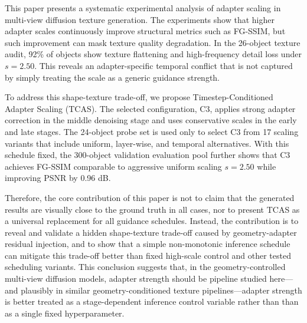 \documentclass[times,twocolumn,final]{elsarticle}
\providecommand{\DIFadd}[1]{{\protect\color{blue} \sf #1}} %
\providecommand{\DIFdel}[1]{{\protect\color{red} \scriptsize #1}} %
\providecommand{\DIFaddbegin}{} %
\providecommand{\DIFaddend}{} %
\providecommand{\DIFdelbegin}{} %
\providecommand{\DIFdelend}{} %
\newcommand{\DIFscaledelfig}{0.5}
\newlength{\DIFdelgraphicswidth} %
\newlength{\DIFdelgraphicsheight} %
\newcommand{\DIFaddincludegraphics}[2][]{{\color{blue}\fbox{\DIFOincludegraphics[#1]{#2}}}} %
\newcommand{\DIFdelincludegraphics}[2][]{%
\sbox{\DIFdelgraphicsbox}{\DIFOincludegraphics[#1]{#2}}%
\settoboxwidth{\DIFdelgraphicswidth}{\DIFdelgraphicsbox} %
\settoboxtotalheight{\DIFdelgraphicsheight}{\DIFdelgraphicsbox} %
\scalebox{\DIFscaledelfig}{%
\parbox[b]{\DIFdelgraphicswidth}{\usebox{\DIFdelgraphicsbox}\\[-\baselineskip] \rule{\DIFdelgraphicswidth}{0em}}\llap{\resizebox{\DIFdelgraphicswidth}{\DIFdelgraphicsheight}{%
\setlength{\unitlength}{\DIFdelgraphicswidth}%
\begin{picture}(1,1)%
\thicklines\linethickness{2pt} %
{\color[rgb]{1,0,0}\put(0,0){\framebox(1,1){}}}%
{\color[rgb]{1,0,0}\put(0,0){\line( 1,1){1}}}%
{\color[rgb]{1,0,0}\put(0,1){\line(1,-1){1}}}%
\end{picture}%
}\hspace*{3pt}}} %
} %
\DeclareRobustCommand{\DIFaddbegin}{\DIFOaddbegin \let\includegraphics\DIFaddincludegraphics} %
\DeclareRobustCommand{\DIFaddend}{\DIFOaddend \let\includegraphics\DIFOincludegraphics} %
\DeclareRobustCommand{\DIFdelbegin}{\DIFOdelbegin \let\includegraphics\DIFdelincludegraphics} %
\DeclareRobustCommand{\DIFdelend}{\DIFOaddend \let\includegraphics\DIFOincludegraphics} %
\begin{document}
This paper presents a systematic experimental analysis of adapter scaling in multi-view diffusion texture generation. The experiments show that higher adapter scales continuously improve structural metrics such as FG-SSIM, but such improvement can mask texture quality degradation. In the 26-object texture audit, 92\% of objects show texture flattening and high-frequency detail loss under $s = 2.50$. This reveals an adapter-specific temporal conflict that is not captured by simply treating the scale as a generic guidance strength.

To address this shape-texture trade-off, we propose Timestep-Conditioned Adapter Scaling (TCAS). The selected configuration, C3, applies strong adapter correction in the middle denoising stage and uses conservative scales in the early and late stages. The 24-object probe set is used only to select C3 from 17 scaling variants that include uniform, layer-wise, and temporal alternatives. With this schedule fixed, the 300-object \DIFdelbegin \DIFdel{validation }\DIFdelend \DIFaddbegin \DIFadd{evaluation pool }\DIFaddend further shows that C3 achieves FG-SSIM comparable to aggressive uniform scaling $s = 2.50$ while improving PSNR by 0.96 dB.

Therefore, the core contribution of this paper is not to claim that the generated results are visually close to the ground truth in all cases, nor to present TCAS as a universal replacement for all guidance schedules. Instead, the contribution is to reveal and validate a hidden shape-texture trade-off caused by geometry-adapter residual injection, and to show that a simple non-monotonic inference schedule can mitigate this trade-off better than fixed high-scale control and other tested scheduling variants. This conclusion suggests that, in \DIFaddbegin \DIFadd{the }\DIFaddend geometry-controlled multi-view \DIFdelbegin \DIFdel{diffusion models, adapter strength should be }\DIFdelend \DIFaddbegin \DIFadd{pipeline studied here---and plausibly in similar geometry-conditioned texture pipelines---adapter strength is better }\DIFaddend treated as a stage-dependent inference control variable \DIFdelbegin \DIFdel{rather than }\DIFdelend \DIFaddbegin \DIFadd{than as }\DIFaddend a single fixed hyperparameter.
\end{document}
